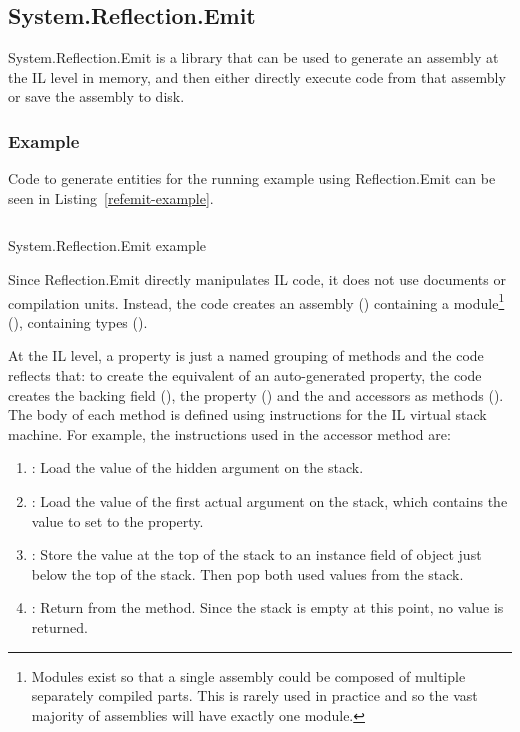 \subsection{System.Reflection.Emit}

System.Reflection.Emit \cite{refemit} is a library that can be used to generate an assembly at the \ac{IL} level in memory, and then either directly execute code from that assembly or save the assembly to disk.

\subsubsection{Example}

Code to generate entities for the running example using Reflection.Emit can be seen in Listing~\ref{refemit-example}.

\begin{listing}
\inputminted[firstline=12,lastline=64]{csharp}{samples/ReflectionEmit/Program.cs}
\caption{System.Reflection.Emit example}
\label{refemit-example}
\end{listing}

Since Reflection.Emit directly manipulates \ac{IL} code, it does not use documents or compilation units. Instead, the code creates an assembly () containing a module\footnote{Modules exist so that a single assembly could be composed of multiple separately compiled parts. This is rarely used in practice and so the vast majority of assemblies will have exactly one module.} (), containing types ().

At the \ac{IL} level, a property is just a named grouping of methods and the code reflects that: to create the equivalent of an auto-generated property, the code creates the backing field (), the property () and the  and  accessors as methods (). The body of each method is defined using instructions for the \ac{IL} virtual stack machine. For example, the instructions used in the  accessor method are:

\begin{enumerate}
\item {}: Load the value of the  hidden argument on the stack.
\item {}: Load the value of the first actual argument on the stack, which contains the value to set to the property.
\item {} \emph{}: Store the value at the top of the stack to an instance field \emph{} of object just below the top of the stack. Then pop both used values from the stack.
\item {}: Return from the method. Since the stack is empty at this point, no value is returned.
\end{enumerate}

